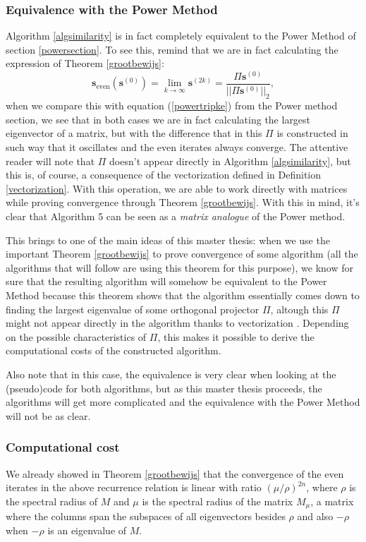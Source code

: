 \documentclass[a4paper,11pt]{report}
\begin{document}
\subsubsection{Equivalence with the Power Method}
Algorithm \ref{algsimilarity} is in fact completely equivalent to the Power 
Method of section \ref{powersection}. To see this, remind that we are in fact 
calculating the expression of Theorem \ref{grootbewijs}:
$$\mathbf{s}_{\text{even}}(\mathbf{s}^{(0)}) = \lim_{k \to \infty} \mathbf{s}^{(2k)}  = \frac{\Pi \mathbf{s}^{(0)}}{||\Pi \mathbf{s}^{(0)}||_2},$$
when we compare 
this with equation (\ref{powertripke}) from the Power method section, we see 
that in both cases we are in fact calculating the largest eigenvector of a matrix, but with the difference 
that in this $\Pi$ is constructed in such way that it oscillates and the even 
iterates always converge. The attentive reader will note that $\Pi$ doesn't 
appear directly in Algorithm \ref{algsimilarity}, but this is, of course, a 
consequence of the vectorization defined in Definition \ref{vectorization}. With 
this operation, we are able to work directly with matrices while proving 
convergence through Theorem \ref{grootbewijs}. With this in mind, it's clear 
that Algorithm 5 can be seen as a \textit{matrix analogue} of the Power method.

This brings to one of the main ideas of this master thesis: when we use the important Theorem \ref{grootbewijs} 
to prove convergence of some algorithm (all the algorithms that will follow are using this 
theorem for this purpose), we know for sure that the resulting algorithm will somehow be equivalent to the Power Method 
because this theorem shows that the algorithm essentially comes down to 
finding the largest eigenvalue of some orthogonal projector $\Pi$, altough this $\Pi$ might not appear
directly in the algorithm thanks to vectorization . Depending on the possible characteristics of $\Pi$, this makes it 
possible to derive the computational costs of the constructed algorithm. 

Also 
note that in this case, the equivalence is very clear when looking at the (pseudo)code for both algorithms, but as this master thesis 
proceeds, the algorithms will get more complicated and the equivalence with the 
Power Method will not be as clear.

\subsubsection{Computational cost}
 We 
already showed in Theorem \ref{grootbewijs} that the convergence of the even 
iterates in the above recurrence relation is linear with ratio $(\mu/\rho)^{2n}$, where $\rho$ is the spectral radius
of $M$ and $\mu$ is the spectral radius
of the matrix $M_\mu$, a matrix where the columns span the subspaces of all 
eigenvectors besides $\rho$ and also $-\rho$ when $-\rho$ is an eigenvalue of $M$.
\end{document}

